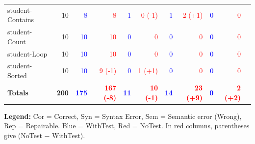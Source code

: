 \documentclass{article}
\begin{document}
\begin{table}[ht]
{\begin{tabular}{lrrrrrrrrrr}
student-Contains               & 10 & \textcolor{blue}{8}  & \textcolor{red}{8}   & \textcolor{blue}{1}  & \textcolor{red}{0 (-1)}   & \textcolor{blue}{1}  & \textcolor{red}{2 (+1)}   & \textcolor{blue}{0}  & \textcolor{red}{0}   \\
student-Count                  & 10 & \textcolor{blue}{10}  & \textcolor{red}{10}   & \textcolor{blue}{0}  & \textcolor{red}{0}   & \textcolor{blue}{0}  & \textcolor{red}{0}   & \textcolor{blue}{0}  & \textcolor{red}{0}   \\
student-Loop                   & 10 & \textcolor{blue}{10}  & \textcolor{red}{10}   & \textcolor{blue}{0}  & \textcolor{red}{0}   & \textcolor{blue}{0}  & \textcolor{red}{0}   & \textcolor{blue}{0}  & \textcolor{red}{0}   \\
student-Sorted                 & 10 & \textcolor{blue}{10}  & \textcolor{red}{9 (-1)}   & \textcolor{blue}{0}  & \textcolor{red}{1 (+1)}   & \textcolor{blue}{0}  & \textcolor{red}{0}   & \textcolor{blue}{0}  & \textcolor{red}{0}   \\
\midrule
\textbf{Totals}             & \textbf{200} &
\textcolor{blue}{\textbf{175}} & \textcolor{red}{\textbf{167 (-8)}} &
\textcolor{blue}{\textbf{11}} & \textcolor{red}{\textbf{10 (-1)}}  &
\textcolor{blue}{\textbf{14}} & \textcolor{red}{\textbf{23 (+9)}}   &
\textcolor{blue}{\textbf{0}} & \textcolor{red}{\textbf{2 (+2)}}   \\
\bottomrule
\end{tabular}%
}

\vspace{0.5em}
\raggedright
\textbf{Legend:} Cor = Correct, Syn = Syntax Error, Sem = Semantic error (Wrong), Rep = Repairable. Blue = WithTest, Red = NoTest. In red columns, parentheses give (NoTest $-$ WithTest).
\end{table}
\end{document}
